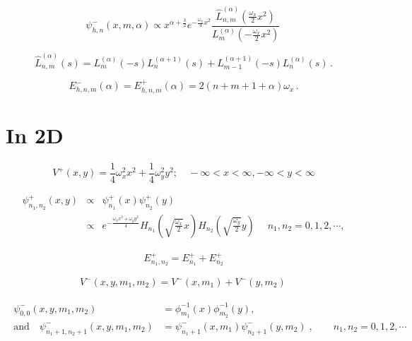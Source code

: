 \documentclass[12pt]{article}
\begin{document}
\begin{equation}\label{HLO:psi-}
\psi^-_{h,n}(x,m,\alpha)\propto x^{\alpha +\frac{3}{2}} e^{-\frac{\omega_x}{4}x^2}\frac{\hat{L}_{n,m}^{(\alpha)}(\frac{\omega_x}{2}x^2)}{L_m^{(\alpha) }\left(-\frac{\omega_x}{2}x^2  \right)}\,
\end{equation}

\begin{equation}
 \hat{L}_{n,m}^{(\alpha)}(s)=L_{m}^{(\alpha)}(-s) L_n^{(\alpha+1)}(s)+L_{m-1}^{(\alpha+1)}(-s) L_{n}^{(\alpha)}(s)\,.
\end{equation}

\begin{equation}\label{HLO:E-}
E^-_{h,n,m}(\alpha)=E^+_{h,n,m}(\alpha)=2\left(n+m+1+\alpha\right)\omega_x\,.
\end{equation}

\section*{In 2D}

\begin{equation}
V^+(x,y)=\frac{1}{4}\omega_x^2 x^2+\frac{1}{4}\omega_y^2 y^2; \quad -\infty<x<\infty,-\infty<y<\infty
\end{equation}

\begin{eqnarray}\label{FLO2D:psi+}
\psi_{n_1,n_2}^+(x,y)&\propto& \psi_{n_1}^+(x)\psi_{n_2}^+(y)\nonumber\\
&\propto&e^{-\frac{\omega_x x^2+\omega_y y^2}{4} } H_{n_1}\left(\sqrt{\frac{\omega_x}{2}} x\right) H_{n_2}\left(\sqrt{\frac{\omega_y}{2}} y\right)\; 
\quad n_1,n_2=0,1,2,\cdots, 		
\end{eqnarray}

\begin{eqnarray}
E^+_{n_1,n_2}=E^+_{n_1}+E^+_{n_2}
\end{eqnarray}


\begin{equation}\label{2D:V-}
V^-(x,y,m_1,m_2)=V^-(x,m_1)+V^-(y,m_2)\,
\end{equation}

\begin{align} \label{2D:psi-}
    \begin{split}
        \psi^-_{0,0}(x,y,m_1,m_2)&=\phi_{m_1}^{-1}(x)\phi_{m_2}^{-1}(y), \\
        \mbox{and} \quad  \psi^-_{n_1+1,n_2+1}(x,y,m_1,m_2)&=\psi^-_{n_1+1}(x,m_1)\psi^-_{n_2+1}(y,m_2)\;,\qquad n_1,n_2=0,1,2,\cdots\\
    \end{split}
\end{align}
\end{document}
